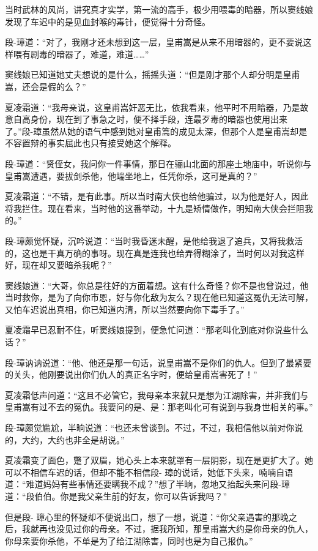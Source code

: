 \documentclass[12pt,oneside]{book}
\begin{document}
当时武林的风尚，讲究真才实学，第一流的高手，极少用喂毒的暗器，所以窦线娘发现了车迟中的是见血封喉的毒针，便觉得十分奇怪。

段-璋道：``对了，我刚才还未想到这一层，皇甫嵩是从来不用暗器的，更不要说这样喂有剧毒的暗器了，难道，难道\ldots\ldots{}''

窦线娘已知道她丈夫想说的是什么，摇摇头道：``但是刚才那个人却分明是皇甫嵩，还会是假的么？''

夏凌霜道：``我母亲说，这皇甫嵩奸恶无比，依我看来，他平时不用暗器，乃是故意自高身份，现在到了事急之时，便不择手段，连最歹毒的暗器也使用出来了。''段-璋虽然从她的语气中感到她对皇甫篙的成见太深，但那个人是皇甫嵩却是不容置辩的事实屈此也只有接受她这个解释。

段-璋道：``贤侄女，我问你一件事情，那日在骊山北面的那座土地庙中，听说你与皇甫嵩遭遇，要拔剑杀他，他端坐地上，任凭你杀，这可是真的？''

夏凌霜道：``不错，是有此事。所以当时南大侠也给他骗过，以为他是好人，因此将我拦住。现在看来，当时他的这番举动，十九是矫情做作，明知南大侠会拦阻我的。''

段-璋颇觉怀疑，沉吟说道：``当时我昏迷未醒，是他给我退了追兵，又将我救活的，这也是干真万确的事呀。现在真是连我也给弄得糊涂了，当时何以对我这样好，现在却又要暗杀我呢？''

窦线娘道：``大哥，你总是往好的方面着想。这有什么奇怪？你不是也曾说过，他当时救你，是为了向你市恩，好与你化敌为友么？现在他已知道这冤仇无法可解，又怕车迟说出真相，你已知道内清，所以当然要向你下毒手了。''

夏凌霜早已忍耐不住，听窦线娘提到，便急忙问道：``那老叫化到底对你说些什么话？''

段-璋讷讷说道：``他、他还是那一句话，说皇甫嵩不是你们的仇人。但到了最紧要的关头，他刚要说出你们仇人的真正名字时，便给皇甫嵩害死了！''

夏凌霜低声问道：``这且不必管它，我母亲本来就只是想为江湖除害，并非我们与皇甫嵩有过不去的冤仇。我要问的是、是：那老叫化可有说到与我身世相关的事。''

段-璋颇觉尴尬，半晌说道：``也还未曾谈到。不过，不过，我相信他以前对你说的，大约，大约也非全是胡说。''

夏凌霜变了面色，蹩了双眉，她心头上本来就罩有一层阴影，现在是更扩大了。她可以不相信车迟的话，但却不能不相信段-
璋的说话，她低下头来，喃喃自语道：``难道妈妈有些事情还要瞒我不成？''想了半晌，忽地又抬起头来问段-璋道：``段伯伯。你是我父亲生前的好友，你可以告诉我吗？''

但是段-
璋心里的怀疑却不便说出口，想了一想，说道：``你父亲遇害的那晚之后，我就再也没见过你的母亲。不过，据我所知，那皇甫嵩大约是你母亲的仇人，你母亲要你杀他，不单是为了给江湖除害，同时也是为自己报仇。''
\end{document}
